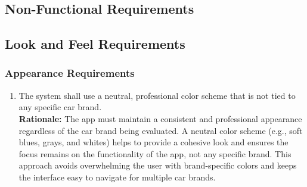 \documentclass[]{article}
\begin{document}
\begin{enumerate}

\section{Non-Functional Requirements}
\label{sec:non-functional_requirements}



\subsection{Look and Feel Requirements}
\label{sub:look_and_feel_requirements}

\subsubsection{Appearance Requirements}
\label{ssub:appearance_requirements}
\begin{enumerate}[{LF-A}1.]
    \item The system shall use a neutral, professional color scheme that is not tied to any specific car brand. \\
    \textbf{Rationale:} The app must maintain a consistent and professional appearance regardless of the car brand being evaluated. A neutral color scheme (e.g., soft blues, grays, and whites) helps to provide a cohesive look and ensures the focus remains on the functionality of the app, not any specific brand. This approach avoids overwhelming the user with brand-specific colors and keeps the interface easy to navigate for multiple car brands.
    

\end{enumerate}
\end{enumerate}
\end{document}
